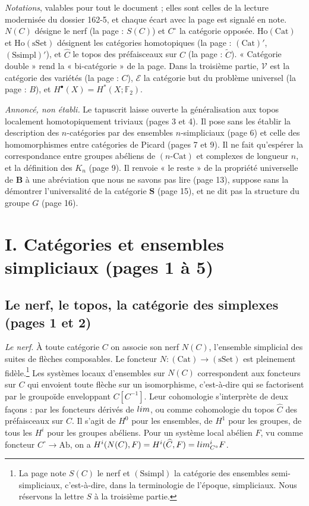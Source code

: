 \documentclass[11pt,a4paper]{article}
\begin{document}
\emph{Notations}, valables pour tout le document ; elles sont celles de la
lecture modernisée du dossier 162-5, et chaque écart avec la page est signalé
en note. $N(C)$ désigne le nerf (la page : $S(C)$) et $C^{\circ}$ la catégorie
opposée. $\mathrm{Ho}(\mathrm{Cat})$ et $\mathrm{Ho}(\mathrm{sSet})$ désignent
les catégories homotopiques (la page : $(\mathrm{Cat})'$, $(\mathrm{Ssimpl})'$),
et $\widehat{C}$ le topos des préfaisceaux sur $C$ (la page : $\widetilde{C}$).
« Catégorie double » rend la « bi-catégorie » de la page. Dans la troisième
partie, $\mathcal{V}$ est la catégorie des variétés (la page : $C$),
$\mathcal{E}$ la catégorie but du problème universel (la page : $B$), et
$H^{\bullet}(X) = H^{*}(X; \mathbb{F}_2)$.

\emph{Annoncé, non établi.} Le tapuscrit laisse ouverte la généralisation aux
topos localement homotopiquement triviaux (pages 3 et 4). Il pose sans les
établir la description des $n$-catégories par des ensembles $n$-simpliciaux
(page 6) et celle des homomorphismes entre catégories de Picard (pages 7 et 9).
Il ne fait qu'espérer la correspondance entre groupes abéliens de
$(n\text{-Cat})$ et complexes de longueur $n$, et la définition des $K_n$
(page 9). Il renvoie « le reste » de la propriété universelle de $\mathbf{B}$ à
une abréviation que nous ne savons pas lire (page 13), suppose sans la
démontrer l'universalité de la catégorie $\mathbf{S}$ (page 15), et ne dit pas
la structure du groupe $G$ (page 16).

\section*{I. Catégories et ensembles simpliciaux (pages 1 à 5)}

\subsection*{Le nerf, le topos, la catégorie des simplexes (pages 1 et 2)}

\emph{Le nerf.} À toute catégorie $C$ on associe son nerf $N(C)$, l'ensemble
simplicial des suites de flèches composables. Le foncteur $N : (\mathrm{Cat})
\to (\mathrm{sSet})$ est pleinement fidèle.\footnote{La page note $S(C)$ le nerf
et $(\mathrm{Ssimpl})$ la catégorie des ensembles semi-simpliciaux,
c'est-à-dire, dans la terminologie de l'époque, simpliciaux. Nous réservons la
lettre $S$ à la troisième partie.} Les systèmes locaux d'ensembles sur $N(C)$
correspondent aux foncteurs sur $C$ qui envoient toute flèche sur un
isomorphisme, c'est-à-dire qui se factorisent par le groupoïde enveloppant
$C[C^{-1}]$. Leur cohomologie s'interprète de deux façons : par les foncteurs
dérivés de $\varprojlim$, ou comme cohomologie du topos $\widehat{C}$ des
préfaisceaux sur $C$. Il s'agit de $H^{0}$ pour les ensembles, de $H^{1}$ pour
les groupes, de tous les $H^{i}$ pour les groupes abéliens. Pour un système
local abélien $F$, vu comme foncteur $C^{\circ} \to \mathrm{Ab}$, on a
$H^{i}(N(C), F) = H^{i}(\widehat{C}, F) = \varprojlim^{i}_{C^{\circ}} F$.
\end{document}
